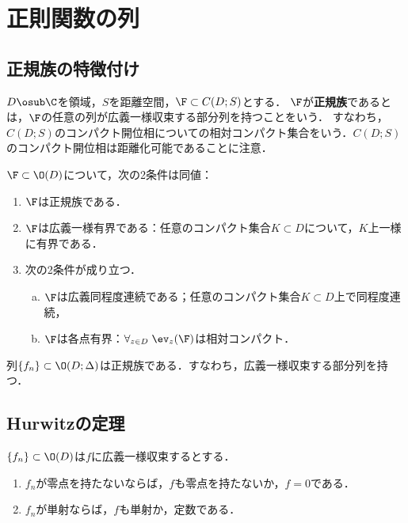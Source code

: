 \documentclass[uplatex, dvipdfmx]{jsreport}
\begin{document}
\section{正則関数の列}

\subsection{正規族の特徴付け}

\begin{definition}
    $D\osub\C$を領域，$S$を距離空間，$\F\subset C(D;S)$とする．
    $\F$が\textbf{正規族}であるとは，$\F$の任意の列が広義一様収束する部分列を持つことをいう．
    すなわち，$C(D;S)$のコンパクト開位相についての相対コンパクト集合をいう．$C(D;S)$のコンパクト開位相は距離化可能であることに注意．
\end{definition}

\begin{theorem}
    $\F\subset\O(D)$について，次の2条件は同値：
    \begin{enumerate}
        \item $\F$は正規族である．
        \item $\F$は広義一様有界である：任意のコンパクト集合$K\subset D$について，$K$上一様に有界である．
        \item 次の2条件が成り立つ．
        \begin{enumerate}[(a)]
            \item $\F$は広義同程度連続である；任意のコンパクト集合$K\subset D$上で同程度連続，
            \item $\F$は各点有界：$\forall_{z\in D}\;\ev_z(\F)$は相対コンパクト．
        \end{enumerate}
    \end{enumerate}
\end{theorem}

\begin{theorem}[Montel]
    列$\{f_n\}\subset\O(D;\Delta)$は正規族である．すなわち，広義一様収束する部分列を持つ．
\end{theorem}

\subsection{Hurwitzの定理}

\begin{theorem}[Hurwitz]
    $\{f_n\}\subset\O(D)$は$f$に広義一様収束するとする．
    \begin{enumerate}
        \item $f_n$が零点を持たないならば，$f$も零点を持たないか，$f=0$である．
        \item $f_n$が単射ならば，$f$も単射か，定数である．
    \end{enumerate}
\end{theorem}
\end{document}
